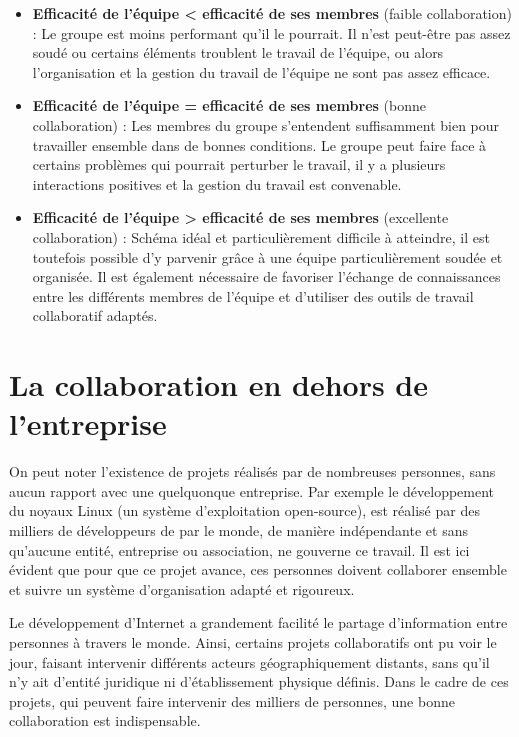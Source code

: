 \begin{itemize}

\item \textbf{Efficacité de l'équipe \textless \: efficacité de ses membres} (faible collaboration) :
Le groupe est moins performant qu'il le pourrait. Il n'est peut-être pas assez soudé ou certains éléments troublent le travail de l'équipe, ou alors l'organisation et la gestion du travail de l'équipe ne sont pas assez efficace.

\item \textbf{Efficacité de l'équipe = efficacité de ses membres} (bonne collaboration) :
Les membres du groupe s'entendent suffisamment bien pour travailler ensemble dans de bonnes conditions. Le groupe peut faire face à certains problèmes qui pourrait perturber le travail, il y a plusieurs interactions positives et la gestion du travail est convenable.

\item \textbf{Efficacité de l'équipe \textgreater \: efficacité de ses membres} (excellente collaboration) :
Schéma idéal et particulièrement difficile à atteindre, il est toutefois possible d'y parvenir grâce à une équipe particulièrement soudée et organisée. Il est également nécessaire de favoriser l'échange de connaissances entre les différents membres de l'équipe et d'utiliser des outils de travail collaboratif adaptés.

\end{itemize}

\section{La collaboration en dehors de l'entreprise}

On peut noter l'existence de projets réalisés par de nombreuses personnes, sans aucun rapport avec une quelquonque entreprise. Par exemple le développement du noyaux Linux (un système d'exploitation open-source), est réalisé par des milliers de développeurs de par le monde, de manière indépendante et sans qu'aucune entité, entreprise ou  association, ne gouverne ce travail. Il est ici évident que pour que ce projet avance, ces personnes doivent collaborer ensemble et suivre un système d'organisation adapté et rigoureux.

Le développement d'Internet a grandement facilité le partage d'information entre personnes à travers le monde. Ainsi, certains projets collaboratifs ont pu voir le jour, faisant intervenir différents acteurs géographiquement distants, sans qu'il n'y ait d'entité juridique ni d'établissement physique définis. Dans le cadre de ces projets, qui peuvent faire intervenir des milliers de personnes, une bonne collaboration est indispensable.

